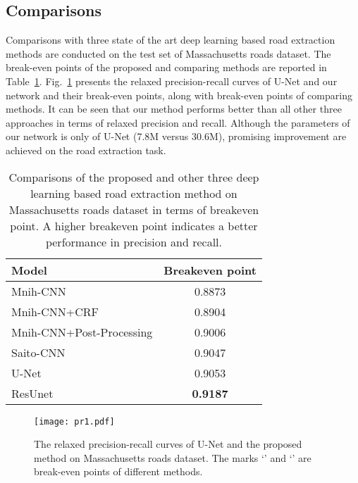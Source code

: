 \documentclass[journal]{IEEEtran}
\begin{document}
\subsection{Comparisons}
Comparisons with three state of the art deep learning based road extraction methods are conducted on the test set of Massachusetts roads dataset. The break-even points of the proposed and comparing methods are reported in Table~\ref{Table:Value at Breakeven Point}. Fig.~\ref{Fig:PR} presents the relaxed precision-recall curves of U-Net and our network and their break-even points, along with break-even points of comparing methods. It can be seen that our method performs better than all other three approaches in terms of relaxed precision and recall. Although the parameters of our network is only  of U-Net (7.8M versus 30.6M), promising improvement are achieved on the road extraction task. 

\begin{table}[!hbp]
\vspace{-0.2cm}
\begin{center}
\caption{Comparisons of the proposed and other three deep learning based road extraction method on Massachusetts roads dataset in terms of breakeven point. A higher breakeven point indicates a better performance in precision and recall. }
\label{Table:Value at Breakeven Point}
\begin{tabular}{l|c}
\hline
Model & Breakeven point\\
\hline
Mnih-CNN\cite{mnih2010learning} & 0.8873  \\
\hline
Mnih-CNN+CRF\cite{mnih2010learning} & 0.8904  \\
\hline
Mnih-CNN+Post-Processing\cite{mnih2010learning} & 0.9006  \\
\hline
Saito-CNN\cite{Saito2016Multiple} & 0.9047 \\
\hline
U-Net\cite{U-NET2015} & 0.9053 \\
\hline
ResUnet & \textbf{0.9187} \\
\hline
\end{tabular}
\end{center}
\vspace{-0.3cm}
\end{table}


\begin{figure}[!t]
\begin{center}
		\texttt{[image: pr1.pdf]}
	    \caption{The relaxed precision-recall curves of U-Net and the proposed method on Massachusetts roads dataset. The marks `' and `' are break-even points of different methods.}
	    \label{Fig:PR}
\end{center}
\vspace{-0.5cm}
\end{figure}
\end{document}
